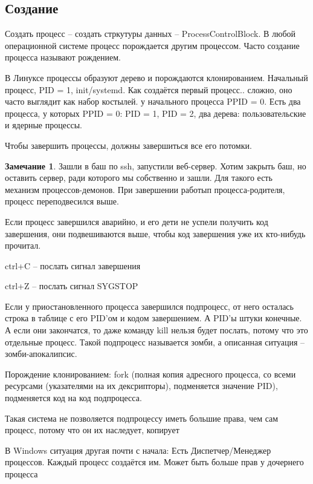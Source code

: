 \documentclass{book}
\theoremstyle{definition}
\newtheorem*{note}{Замечание}
\begin{document}
\subsection{Создание}

Создать процесс -- создать стркутуры данных -- ProcessControlBlock. В любой операционной системе процесс порождается другим процессом. Часто создание процесса называют рождением.

В Линуксе процессы образуют дерево и порождаются клонированием. Начальный процесс, PID = 1, init/systemd. Как создаётся первый процесс.. сложно, оно часто выглядит как набор костылей. у начального процесса PPID = 0. Есть два процесса, у которых PPID = 0: PID = 1, PID = 2, два дерева: пользовательские и ядерные процессы.

Чтобы завершить процессы, должны завершиться все его потомки.

\begin{note}
    Зашли в баш по ssh, запустили веб-сервер. Хотим закрыть баш, но оставить сервер, ради которого мы собственно и зашли. Для такого есть механизм процессов-демонов. При завершении работып процесса-родителя, процесс переподвесился выше.
\end{note}

    Если процесс завершился аварийно, и его дети не успели получить код завершения, они подвешиваются выше, чтобы код завершения уже их кто-нибудь прочитал.

    ctrl+C -- послать сигнал завершения

    ctrl+Z -- послать сигнал SYGSTOP

    Если у приостановленного процесса завершился подпроцесс, от него осталась строка в таблице с его PID'ом и кодом завершением. А PID'ы штуки конечные. А если они закончатся, то даже команду kill нельзя будет послать, потому что это отдельные процесс. Такой подпроцесс называется зомби, а описанная ситуация -- зомби-апокалипсис.

    Порождение клонированием: fork (полная копия адресного процесса, со всеми ресурсами (указателями на их дексрипторы), подменяется значение PID), подменяется код на код подпроцесса.

    Такая система не позволяется подпроцессу иметь большие права, чем сам процесс, потому что он их наследует, копирует

    В Windows ситуация другая почти с начала: Есть Диспетчер/Менеджер процессов. Каждый процесс создаётся им. Может быть больше прав у дочернего процесса
\end{document}
